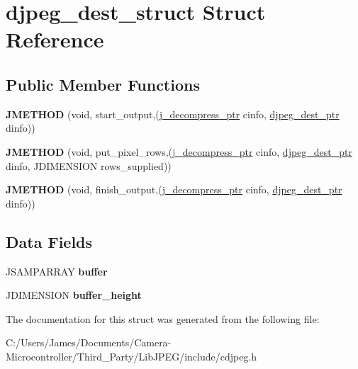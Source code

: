 \hypertarget{structdjpeg__dest__struct}{}\section{djpeg\+\_\+dest\+\_\+struct Struct Reference}
\label{structdjpeg__dest__struct}
\subsection*{Public Member Functions}
\begin{DoxyCompactItemize}
\item 
\mbox{\label{structdjpeg__dest__struct_a6abbb2da3e9740c3b7a23c2cef9330cb}} 
{\bfseries J\+M\+E\+T\+H\+OD} (void, start\+\_\+output,(\hyperlink{structjpeg__decompress__struct}{j\+\_\+decompress\+\_\+ptr} cinfo, \hyperlink{structdjpeg__dest__struct}{djpeg\+\_\+dest\+\_\+ptr} dinfo))
\item 
\mbox{\label{structdjpeg__dest__struct_a448693993de0b4d4102cae86e8be63a1}} 
{\bfseries J\+M\+E\+T\+H\+OD} (void, put\+\_\+pixel\+\_\+rows,(\hyperlink{structjpeg__decompress__struct}{j\+\_\+decompress\+\_\+ptr} cinfo, \hyperlink{structdjpeg__dest__struct}{djpeg\+\_\+dest\+\_\+ptr} dinfo, J\+D\+I\+M\+E\+N\+S\+I\+ON rows\+\_\+supplied))
\item 
\mbox{\label{structdjpeg__dest__struct_a0697f59a40812a85161e214cb42bee81}} 
{\bfseries J\+M\+E\+T\+H\+OD} (void, finish\+\_\+output,(\hyperlink{structjpeg__decompress__struct}{j\+\_\+decompress\+\_\+ptr} cinfo, \hyperlink{structdjpeg__dest__struct}{djpeg\+\_\+dest\+\_\+ptr} dinfo))
\end{DoxyCompactItemize}
\subsection*{Data Fields}
\begin{DoxyCompactItemize}
\item 
\mbox{\label{structdjpeg__dest__struct_a020c264c21f603ef8cb5822e2ebbba29}} 
J\+S\+A\+M\+P\+A\+R\+R\+AY {\bfseries buffer}
\item 
\mbox{\label{structdjpeg__dest__struct_afc922a7a9a60d795a455e3f4dea032a0}} 
J\+D\+I\+M\+E\+N\+S\+I\+ON {\bfseries buffer\+\_\+height}
\end{DoxyCompactItemize}


The documentation for this struct was generated from the following file\+:\begin{DoxyCompactItemize}
\item 
C\+:/\+Users/\+James/\+Documents/\+Camera-\/\+Microcontroller/\+Third\+\_\+\+Party/\+Lib\+J\+P\+E\+G/include/cdjpeg.\+h\end{DoxyCompactItemize}

